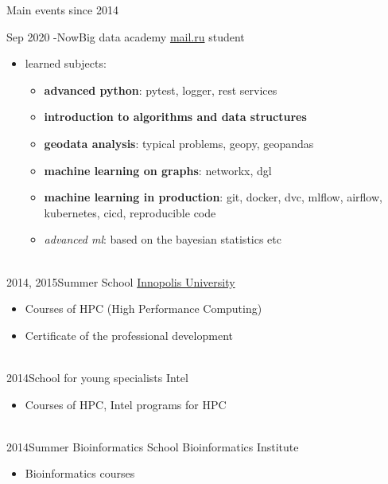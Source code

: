 \documentclass[letterpaper]{twentysecondcv} %
\begin{document}
Main events since 2014

\begin{twenty}
        \twentyitem
        {Sep 2020 -}{Now}{Big data academy}
        {\href{http://data.mail.ru/}{mail.ru} }{student}
        {
            {\begin{itemize}
                \item learned subjects:
                    {\begin{itemize}
                    \item \textbf{advanced python}: pytest, logger, rest services
                    \item \textbf{introduction to algorithms and data structures}
                    \item \textbf{geodata analysis}: typical problems, geopy, geopandas
                    \item \textbf{machine learning on graphs}: networkx, dgl
                    \item \textbf{machine learning in production}: git, docker, dvc, mlflow, airflow, kubernetes, cicd, reproducible code
                    \item \emph{advanced ml}: based on the bayesian statistics etc
                    \end{itemize}}

            \end{itemize}}
        }
        \\
        \twentyitem
        {2014, 2015}{}{Summer School}
        { \href{https://https://innopolis.university/en/}{Innopolis University}}
        {}
        {
        {\begin{itemize}
            \item Courses of HPC (High Performance Computing)
            \item Certificate of the professional development
        \end{itemize}}
        }
        \\
        \twentyitem
        {2014}{}{School for young specialists}
        {Intel}{}
        {
        {\begin{itemize}
            \item Courses of HPC, Intel programs for HPC
        \end{itemize}}
        }
        \\
        \twentyitem
        {2014}{}{Summer Bioinformatics School}
        {Bioinformatics Institute}{}
        {
        {\begin{itemize}
            \item Bioinformatics courses
        \end{itemize}}
        }
\end{twenty}
\end{document}
